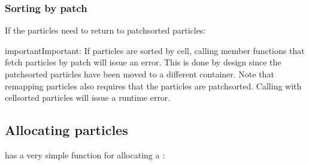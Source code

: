 \documentclass[letterpaper,10pt,english]{sphinxmanual}
\begin{document}
\begin{sphinxVerbatim}[commandchars=\\\{\},formatcom=\scriptsize]
             
               
\end{sphinxVerbatim}


\subsubsection{Sorting by patch}
\label{\detokenize{Source/Particles:sorting-by-patch}}
\sphinxAtStartPar
If the particles need to return to patch\sphinxhyphen{}sorted particles:

\begin{sphinxVerbatim}[commandchars=\\\{\},formatcom=\scriptsize]
 

\end{sphinxVerbatim}

\begin{sphinxadmonition}{important}{Important:}
\sphinxAtStartPar
If particles are sorted by cell, calling  member functions that fetch particles by patch will issue an error.
This is done by design since the patch\sphinxhyphen{}sorted particles have been moved to a different container.
Note that remapping particles also requires that the particles are patch\sphinxhyphen{}sorted.
Calling  with cell\sphinxhyphen{}sorted particles will issue a run\sphinxhyphen{}time error.
\end{sphinxadmonition}


\subsection{Allocating particles}
\label{\detokenize{Source/Particles:allocating-particles}}
\sphinxAtStartPar
{} has a very simple function for allocating a :
\end{document}
